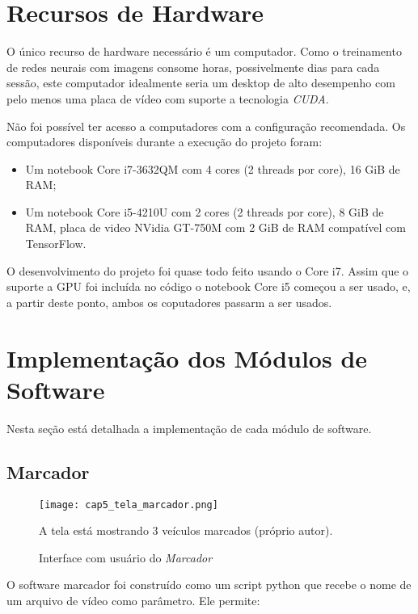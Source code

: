 \section{Recursos de Hardware}

O único recurso de hardware necessário é um computador. Como o treinamento de
redes neurais com imagens consome horas, possivelmente dias para cada sessão,
este computador idealmente seria um desktop de alto desempenho com pelo menos
uma placa de vídeo com suporte a tecnologia \emph{CUDA}.

Não foi possível ter acesso a computadores com a configuração recomendada.
Os computadores disponíveis durante a execução do projeto foram:

\begin{itemize}
\item Um notebook Core i7-3632QM com 4 cores (2 threads por core), 16 GiB
	de RAM;
\item Um notebook Core i5-4210U com 2 cores (2 threads por core), 8 GiB de RAM,
	placa de video NVidia GT-750M com 2 GiB de RAM compatível com TensorFlow.
\end{itemize}

O desenvolvimento do projeto foi quase todo feito usando o Core i7. Assim que
o suporte a GPU foi incluída no código o notebook Core i5 começou a ser usado,
e, a partir deste ponto, ambos os coputadores passarm a ser usados.

\section{Implementação dos Módulos de Software}

Nesta seção está detalhada a implementação de cada módulo de software.

\subsection{Marcador}

\begin{figure}[!htb]
	\centering
	\texttt{[image: cap5\_tela\_marcador.png]}
	\caption{Interface com usuário do \emph{Marcador}}
	\label{fig:cap5_tela_marcador}
	A tela está mostrando 3 veículos marcados (próprio autor).
\end{figure}

O software marcador foi construído como um script python que recebe o nome de
um arquivo de vídeo como parâmetro. Ele permite:

